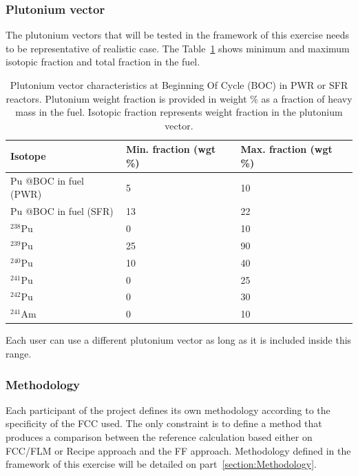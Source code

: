 \documentclass[review]{elsarticle}
\begin{document}
\subsubsection{Plutonium vector}

The plutonium vectors that will be tested in the framework of this exercise needs to be representative of realistic case. The Table~\ref{tab:PuVector} shows minimum and maximum isotopic fraction and total fraction in the fuel. 

\begin{table}[]
\begin{center}
    \begin{tabular}{|l|l|l|}
        \hline
        Isotope & Min. fraction (wgt \%) & Max. fraction (wgt \%) \\
        \hline
        Pu @BOC in fuel (PWR) & 5 & 10 \\
        Pu @BOC in fuel (SFR) & 13 & 22 \\
        \hline
        $^{238}$Pu & 0 & 10 \\
        $^{239}$Pu & 25 & 90 \\
        $^{240}$Pu & 10 & 40 \\
        $^{241}$Pu & 0 & 25 \\
        $^{242}$Pu & 0 & 30 \\
        $^{241}$Am & 0 & 10 \\
        \hline
    \end{tabular}
\end{center}
\caption{Plutonium vector characteristics at Beginning Of Cycle (BOC) in PWR or SFR reactors. Plutonium weight fraction is provided in weight \% as a fraction of heavy mass in the fuel. Isotopic fraction represents weight fraction in the plutonium vector.}
\label{tab:PuVector}
\end{table}


Each user can use a different plutonium vector as long as it is included inside this range.
    
\subsubsection{Methodology}

Each participant of the project defines its own methodology according to the specificity of the FCC used. The only constraint is to define a method that produces a comparison between the reference calculation based either on FCC/FLM or Recipe approach and the FF approach. Methodology defined in the framework of this exercise will be detailed on part~\ref{section:Methodology}.
\end{document}
